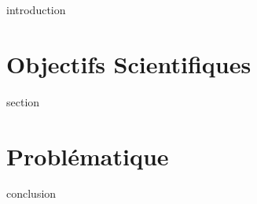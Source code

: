 \chaptertoc{}

\label{sec:2-int}
{introduction}

\section{Objectifs Scientifiques}
\label{sec:2-1}
{section}

\section{Problématique}
\label{sec:2-2}


\label{sec:2-cnc}
{conclusion}


